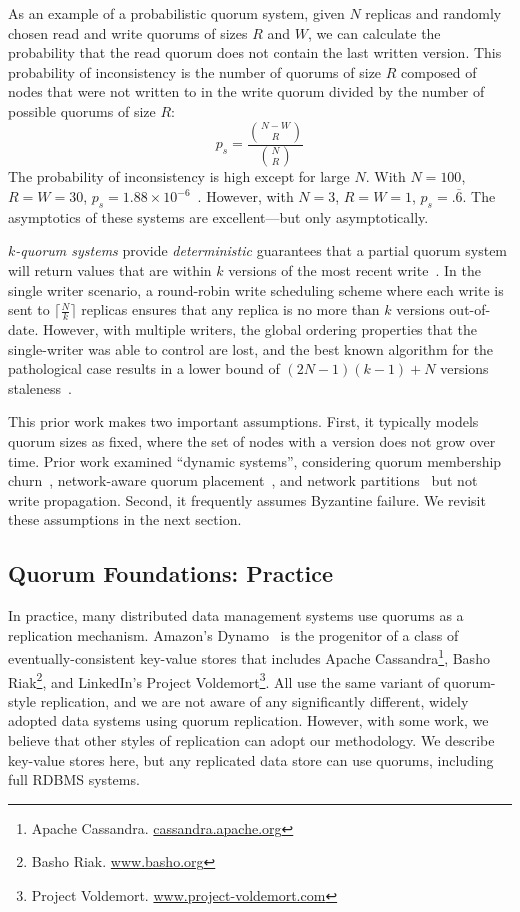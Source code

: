 \documentclass{vldb}
\newcommand{\subsectionskip}{-0em}
\begin{document}
As an example of a probabilistic quorum system, given $N$ replicas and
randomly chosen read and write quorums of sizes $R$ and $W$, we can
calculate the probability that the read quorum does not contain the
last written version.  This probability of inconsistency is the number
of quorums of size $R$ composed of nodes that were not written to in
the write quorum divided by the number of possible quorums of size
$R$:
\begin{equation}
\label{eq:prob-strict}
p_{s}=\frac{{N-W \choose R}}{{N \choose R}}
\end{equation}
The probability of inconsistency is high except for large $N$.  With
$N=100$, $R=W=30$, $p_{s} = 1.88 \times
10^{-6}$~\cite{non-strict}.  However, with $N=3$, $R=W=1$, $p_{s}
= .\overline{6}$.  The asymptotics of these systems are
excellent---but only asymptotically.

\textit{$k$-quorum systems} provide \textit{deterministic} guarantees
that a partial quorum system will return values that are within $k$
versions of the most recent write~\cite{non-strict}.  In the single
writer scenario, a round-robin write scheduling scheme where each
write is sent to $\lceil\frac{N}{k}\rceil$ replicas ensures that any
replica is no more than $k$ versions out-of-date.  However, with
multiple writers, the global ordering properties that the
single-writer was able to control are lost, and the best known
algorithm for the pathological case results in a lower bound of
$(2N-1)(k-1)+N$ versions staleness~\cite{multi-k-quorum}.

This prior work makes two important assumptions. First, it typically
models quorum sizes as fixed, where the set of nodes with a version
does not grow over time.  Prior work examined ``dynamic systems'',
considering quorum membership churn~\cite{prob-quorum-dynamic},
network-aware quorum placement~\cite{delay-quorum, quorum-placement},
and network partitions~\cite{partitionedquorum} but not write
propagation. Second, it frequently assumes Byzantine failure.  We
revisit these assumptions in the next section.

\vspace{\subsectionskip}\subsection{Quorum Foundations: Practice}
\label{sec:practice}

In practice, many distributed data management systems use quorums as a
replication mechanism. Amazon's Dynamo~\cite{dynamo} is the progenitor
of a class of eventually-consistent key-value stores that includes
Apache Cassandra\footnote{Apache Cassandra.
  \url{cassandra.apache.org}}, Basho Riak\footnote{Basho Riak.
  \url{www.basho.org}}, and LinkedIn's Project
Voldemort\footnote{Project Voldemort.
  \url{www.project-voldemort.com}}.  All use the same variant of
quorum-style replication, and we are not aware of any significantly
different, widely adopted data systems using quorum replication.
However, with some work, we believe that other styles of replication
can adopt our methodology.  We describe key-value stores here, but any
replicated data store can use quorums, including full RDBMS systems.
\end{document}
